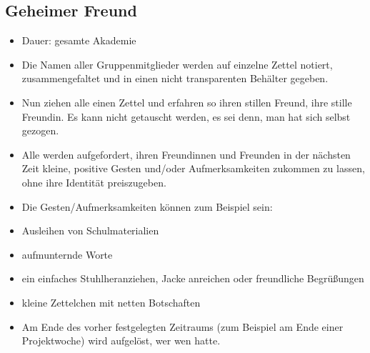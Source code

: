 \documentclass[a4paper, 11pt]{article}
\begin{document}
\subsection{Geheimer Freund}

\begin{itemize}
    \item Dauer: gesamte Akademie
    \item Die Namen aller Gruppenmitglieder werden auf einzelne Zettel notiert, zusammengefaltet und in einen nicht transparenten Behälter gegeben.
    \item Nun ziehen alle einen Zettel und erfahren so ihren stillen Freund, ihre stille Freundin. Es kann nicht getauscht werden, es sei denn, man hat sich selbst gezogen.
    \item Alle werden aufgefordert, ihren Freundinnen und Freunden in der nächsten Zeit kleine, positive Gesten und/oder Aufmerksamkeiten zukommen zu lassen, ohne ihre Identität preiszugeben.
    \item Die Gesten/Aufmerksamkeiten können zum Beispiel sein:
    \item  Ausleihen von Schulmaterialien
    \item aufmunternde Worte
    \item  ein einfaches Stuhlheranziehen, Jacke anreichen oder freundliche Begrüßungen
    \item kleine Zettelchen mit netten Botschaften 
    \item Am Ende des vorher festgelegten Zeitraums (zum Beispiel am Ende einer Projektwoche) wird aufgelöst, wer wen hatte. 
\end{itemize}
\end{document}
